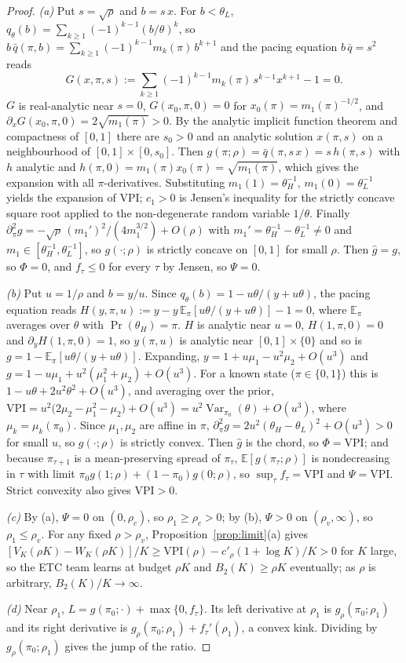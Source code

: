 \documentclass[11pt]{article}
\theoremstyle{definition}
\theoremstyle{remark}
\newcommand{\E}{\mathbb{E}}
\newcommand{\qbar}{\bar q}
\newcommand{\VPI}{\mathrm{VPI}}
\newcommand{\gcav}{\hat g}
\DeclareMathOperator{\Var}{Var}
\begin{document}
\begin{proof}
\emph{(a)} Put $s=\sqrt\rho$ and $b=s\,x$. For $b<\theta_L$,
$q_\theta(b)=\sum_{k\ge1}(-1)^{k-1}(b/\theta)^k$, so $b\,\qbar(\pi,b)=\sum_{k\ge1}(-1)^{k-1}m_k(\pi)\,b^{k+1}$ and the
pacing equation $b\,\qbar=s^2$ reads
\[
G(x,\pi,s):=\sum_{k\ge1}(-1)^{k-1}m_k(\pi)\,s^{k-1}x^{k+1}-1=0 .
\]
$G$ is real-analytic near $s=0$, $G(x_0,\pi,0)=0$ for $x_0(\pi)=m_1(\pi)^{-1/2}$, and
$\partial_xG(x_0,\pi,0)=2\sqrt{m_1(\pi)}>0$. By the analytic implicit function theorem and compactness of $[0,1]$
there are $s_0>0$ and an analytic solution $x(\pi,s)$ on a neighbourhood of $[0,1]\times[0,s_0]$. Then
$g(\pi;\rho)=\qbar(\pi,s\,x)=s\,h(\pi,s)$ with $h$ analytic and $h(\pi,0)=m_1(\pi)x_0(\pi)=\sqrt{m_1(\pi)}$, which gives the
expansion with all $\pi$-derivatives. Substituting $m_1(1)=\theta_H^{-1}$, $m_1(0)=\theta_L^{-1}$ yields the expansion of
$\VPI$; $c_1>0$ is Jensen's inequality for the strictly concave square root applied to the non-degenerate random
variable $1/\theta$. Finally
$\partial_\pi^2g=-\sqrt\rho\,(m_1')^2/(4m_1^{3/2})+O(\rho)$ with $m_1'=\theta_H^{-1}-\theta_L^{-1}\neq0$ and
$m_1\in[\theta_H^{-1},\theta_L^{-1}]$, so $g(\cdot;\rho)$ is strictly concave on $[0,1]$ for small $\rho$. Then
$\gcav=g$, so $\Phi=0$, and $f_\tau\le0$ for every $\tau$ by Jensen, so $\Psi=0$.

\emph{(b)} Put $u=1/\rho$ and $b=y/u$. Since $q_\theta(b)=1-u\theta/(y+u\theta)$, the pacing equation reads
$H(y,\pi,u):=y-y\,\E_\pi[u\theta/(y+u\theta)]-1=0$, where $\E_\pi$ averages over $\theta$ with $\Pr(\theta_H)=\pi$.
$H$ is analytic near $u=0$, $H(1,\pi,0)=0$ and $\partial_yH(1,\pi,0)=1$, so $y(\pi,u)$ is analytic near
$[0,1]\times\{0\}$ and so is $g=1-\E_\pi[u\theta/(y+u\theta)]$. Expanding,
$y=1+u\mu_1-u^2\mu_2+O(u^3)$ and $g=1-u\mu_1+u^2(\mu_1^2+\mu_2)+O(u^3)$. For a known state ($\pi\in\{0,1\}$)
this is $1-u\theta+2u^2\theta^2+O(u^3)$, and averaging over the prior,
$\VPI=u^2\bigl(2\mu_2-\mu_1^2-\mu_2\bigr)+O(u^3)=u^2\Var_{\pi_0}(\theta)+O(u^3)$, where $\mu_k=\mu_k(\pi_0)$.
Since $\mu_1,\mu_2$ are affine in $\pi$,
$\partial_\pi^2g=2u^2(\theta_H-\theta_L)^2+O(u^3)>0$ for small $u$, so $g(\cdot;\rho)$ is strictly convex. Then
$\gcav$ is the chord, so $\Phi=\VPI$; and because $\pi_{\tau+1}$ is a mean-preserving spread of $\pi_\tau$,
$\E[g(\pi_\tau;\rho)]$ is nondecreasing in $\tau$ with limit $\pi_0g(1;\rho)+(1-\pi_0)g(0;\rho)$, so
$\sup_\tau f_\tau=\VPI$ and $\Psi=\VPI$. Strict convexity also gives $\VPI>0$.

\emph{(c)} By (a), $\Psi=0$ on $(0,\rho_c)$, so $\rho_1\ge\rho_c>0$; by (b), $\Psi>0$ on $(\rho_v,\infty)$, so
$\rho_1\le\rho_v$. For any fixed $\rho>\rho_v$, Proposition~\ref{prop:limit}(a) gives
$[V_K(\rho K)-W_K(\rho K)]/K\ge\VPI(\rho)-c'_\rho(1+\log K)/K>0$ for $K$ large, so the ETC team learns at budget
$\rho K$ and $B_2(K)\ge\rho K$ eventually; as $\rho$ is arbitrary, $B_2(K)/K\to\infty$.

\emph{(d)} Near $\rho_1$, $L=g(\pi_0;\cdot)+\max\{0,f_\tau\}$. Its left derivative at $\rho_1$ is
$g_\rho(\pi_0;\rho_1)$ and its right derivative is $g_\rho(\pi_0;\rho_1)+f_\tau'(\rho_1)$, a convex kink. Dividing by $g_\rho(\pi_0;\rho_1)$ gives the jump
of the ratio.
\end{proof}
\end{document}
